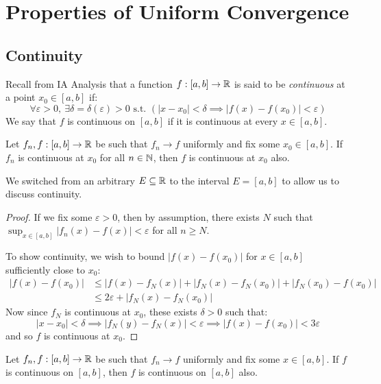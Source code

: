 \documentclass[../main.tex]{subfiles}
\begin{document}
\section{Properties of Uniform Convergence}
\subsection{Continuity}
\begin{remark}[Recap]
  Recall from IA Analysis that a function $f: [a, b] \to \mathbb{R}$ is said to be \textit{continuous} at a point $x_0 \in [a, b]$ if:
  \[
    \forall \varepsilon > 0,\ \exists \delta = \delta(\varepsilon) > 0 \text{ s.t. } (|x - x_0| < \delta \implies |f(x) - f(x_0)| < \varepsilon)
  \]
  We say that $f$ is continuous on $[a, b]$ if it is continuous at every $x \in [a, b]$.
\end{remark}
\begin{theorem}
  Let $f_n, f: [a, b] \to \mathbb{R}$ be such that $f_n \to f$ uniformly and fix some $x_0 \in [a, b]$.
  If $f_n$ is continuous at $x_0$ for all $n \in \mathbb{N}$, then $f$ is continuous at $x_0$ also. \label{unifCont}
\end{theorem}
\begin{remark}[Note]
  We switched from an arbitrary $E \subseteq \mathbb{R}$ to the interval $E = [a, b]$ to allow us to discuss continuity.
\end{remark}
\begin{proof}
  If we fix some $\varepsilon > 0$, then by assumption, there exists $N$ such that $\sup_{x \in [a, b]} |f_n(x) - f(x)| < \varepsilon$ for all $n \geq N$.

  To show continuity, we wish to bound $|f(x) - f(x_0)|$ for $x \in [a, b]$ sufficiently close to $x_0$:
  \begin{align*}
    |f(x) - f(x_0)| &\leq |f(x) - f_N(x)| + |f_N(x) - f_N(x_0)| + |f_N(x_0) - f(x_0)| \\
                  &\leq 2\varepsilon + |f_N(x) - f_N(x_0)|
  \end{align*}
  Now since $f_N$ is continuous at $x_0$, these exists $\delta > 0$ such that:
  \[
    |x - x_0| < \delta \implies |f_N(y) - f_N(x)| < \varepsilon \implies |f(x) - f(x_0)| < 3 \varepsilon
  \]
  and so $f$ is continuous at $x_0$.
\end{proof}
\begin{corollary}
  Let $f_n, f: [a, b] \to \mathbb{R}$ be such that $f_n \to f$ uniformly and fix some $x \in [a, b]$.
  If $f$ is continuous on $[a, b]$, then $f$ is continuous on $[a, b]$ also. \label{unifContFunc}
\end{corollary}
\end{document}
